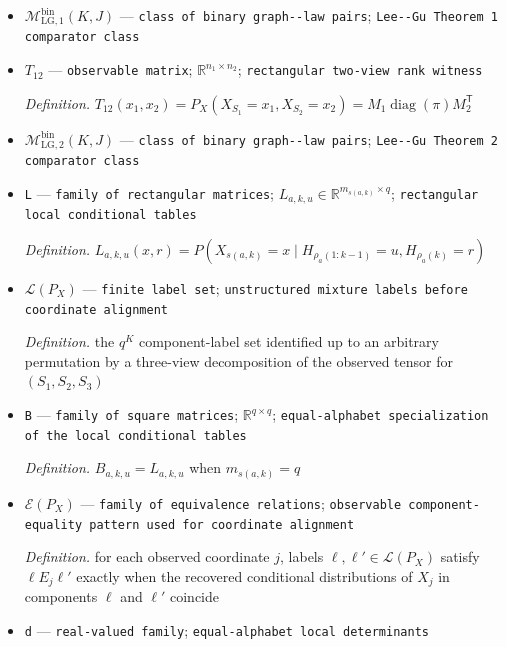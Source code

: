 \documentclass{article}
\begin{document}
\begin{itemize}
  \item \(\mathcal M_{\mathrm{LG},1}^{\mathrm{bin}}(K,J)\) --- \texttt{class of binary graph-\allowbreak{}-\allowbreak{}law pairs}; \texttt{Lee-\allowbreak{}-\allowbreak{}Gu Theorem 1 comparator class}
  \item \(T_{12}\) --- \texttt{observable matrix}; \(\mathbb R^{n_1\times n_2}\); \texttt{rectangular two-\allowbreak{}view rank witness}
  \par\smallskip\noindent\emph{Definition.} \(T_{12}(x_1,x_2)=P_X(X_{S_1}=x_1,X_{S_2}=x_2)=M_1\operatorname{diag}(\pi)M_2^{\mathsf T}\)
  \item \(\mathcal M_{\mathrm{LG},2}^{\mathrm{bin}}(K,J)\) --- \texttt{class of binary graph-\allowbreak{}-\allowbreak{}law pairs}; \texttt{Lee-\allowbreak{}-\allowbreak{}Gu Theorem 2 comparator class}
  \item \texttt{L} --- \texttt{family of rectangular matrices}; \(L_{a,k,u}\in\mathbb R^{m_{s(a,k)}\times q}\); \texttt{rectangular local conditional tables}
  \par\smallskip\noindent\emph{Definition.} \(L_{a,k,u}(x,r)=P(X_{s(a,k)}=x\mid H_{\rho_a(1:k-1)}=u,H_{\rho_a(k)}=r)\)
  \item \(\mathscr L(P_X)\) --- \texttt{finite label set}; \texttt{unstructured mixture labels before coordinate alignment}
  \par\smallskip\noindent\emph{Definition.} the \(q^K\) component-label set identified up to an arbitrary permutation by a three-view decomposition of the observed tensor for \((S_1,S_2,S_3)\)
  \item \texttt{B} --- \texttt{family of square matrices}; \(\mathbb R^{q\times q}\); \texttt{equal-\allowbreak{}alphabet specialization of the local conditional tables}
  \par\smallskip\noindent\emph{Definition.} \(B_{a,k,u}=L_{a,k,u}\) when \(m_{s(a,k)}=q\)
  \item \(\mathcal E(P_X)\) --- \texttt{family of equivalence relations}; \texttt{observable component-\allowbreak{}equality pattern used for coordinate alignment}
  \par\smallskip\noindent\emph{Definition.} for each observed coordinate \(j\), labels \(\ell,\ell'\in\mathscr L(P_X)\) satisfy \(\ell\mathrel{E_j}\ell'\) exactly when the recovered conditional distributions of \(X_j\) in components \(\ell\) and \(\ell'\) coincide
  \item \texttt{d} --- \texttt{real-\allowbreak{}valued family}; \texttt{equal-\allowbreak{}alphabet local determinants}

\end{itemize}
\end{document}
